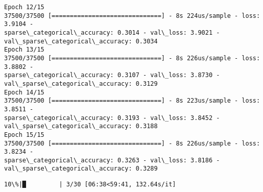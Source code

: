 \documentclass[11pt]{article}
\begin{document}
\begin{Verbatim}[commandchars=\\\{\}]
Epoch 12/15
37500/37500 [==============================] - 8s 224us/sample - loss: 3.9104 -
sparse\_categorical\_accuracy: 0.3014 - val\_loss: 3.9021 -
val\_sparse\_categorical\_accuracy: 0.3034
Epoch 13/15
37500/37500 [==============================] - 8s 226us/sample - loss: 3.8802 -
sparse\_categorical\_accuracy: 0.3107 - val\_loss: 3.8730 -
val\_sparse\_categorical\_accuracy: 0.3129
Epoch 14/15
37500/37500 [==============================] - 8s 223us/sample - loss: 3.8511 -
sparse\_categorical\_accuracy: 0.3193 - val\_loss: 3.8452 -
val\_sparse\_categorical\_accuracy: 0.3188
Epoch 15/15
37500/37500 [==============================] - 8s 226us/sample - loss: 3.8234 -
sparse\_categorical\_accuracy: 0.3263 - val\_loss: 3.8186 -
val\_sparse\_categorical\_accuracy: 0.3289
    \end{Verbatim}

    \begin{Verbatim}[commandchars=\\\{\}]
 10\%|█         | 3/30 [06:38<59:41, 132.64s/it]
    \end{Verbatim}
\end{document}
